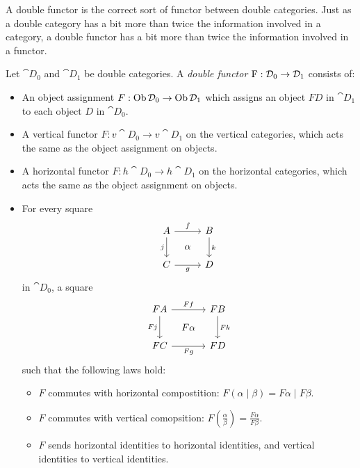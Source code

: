 \documentclass[DynamicalBook]{subfiles}
\begin{document}
A double functor is the correct sort of functor between double categories. Just
as a double category has a bit more than twice the information involved in a
category, a double functor has a bit more than twice the information involved in
a functor.
 \begin{definition}\label{def.double_functor}
 Let $\cat{D}_0$ and $\cat{D}_1$ be double categories. A \emph{double functor}
 $\mathrm{F} : \mathcal{D}_0 \to \mathcal{D}_1$ consists of:
\begin{itemize}
  \item An object assignment $F : \operatorname{Ob} \mathcal{D}_0 \to \operatorname{Ob} \mathcal{D}_1$ which assigns an object $F D$
    in $\cat{D}_1$ to each object $D$ in $\cat{D}_0$.
  \item A vertical functor $F : v\cat{D}_0 \to v\cat{D}_1$ on the vertical
    categories, which acts the same as the object assignment on objects.
  \item A horizontal functor $F : h\cat{D}_0 \to h\cat{D}_1$ on the horizontal
    categories, which acts the same as the object assignment on objects.
  \item For every square
    \[
        \begin{tikzcd}[sep=tiny]
          A \ar[dd, "j"'] \ar[rr, "f"] & & B \ar[dd, "k"] \\
           & \alpha & \\
          C \ar[rr, "g"'] & & D
        \end{tikzcd}
    \]
    in $\cat{D}_0$, a square
    \[
        \begin{tikzcd}[sep=tiny]
          FA \ar[dd, "Fj"'] \ar[rr, "Ff"] & & FB \ar[dd, "Fk"] \\
           & F\alpha & \\
          FC \ar[rr, "Fg"'] & & FD
        \end{tikzcd}
    \]
    such that the following laws hold:
    \begin{itemize}
    \item $F$ commutes with horizontal compostition: $F(\alpha \mid \beta) = F\alpha \mid F\beta$.
    \item $F$ commutes with vertical comopsition: $F\left( \frac{\alpha}{\beta} \right) = \frac{F\alpha}{F\beta}$.
    \item $F$ sends horizontal identities to horizontal identities, and vertical
      identities to vertical identities.
    \end{itemize}
\end{itemize}
\end{definition}
\end{document}
